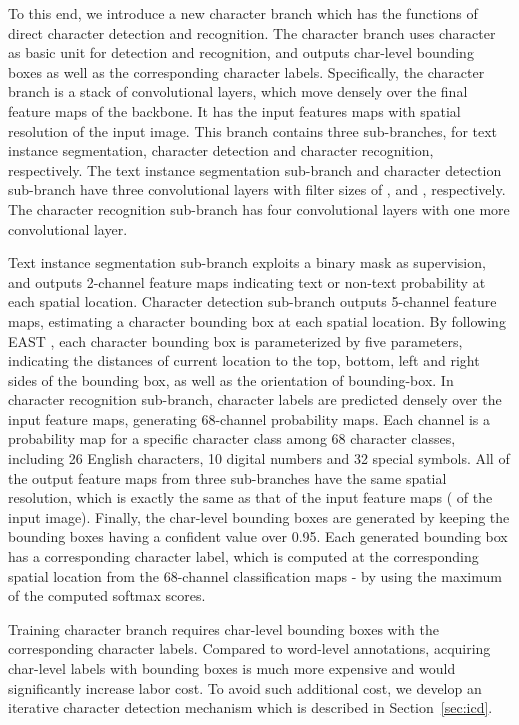 \documentclass[10pt,twocolumn,letterpaper]{article}
\begin{document}
To this end, we introduce a new character branch which has the functions of direct character detection and recognition. The character branch uses character as basic unit for detection and recognition, and outputs char-level bounding boxes as well as the corresponding character labels. Specifically, the character branch is a stack of convolutional layers, which move densely over the final feature maps of the backbone.
It has the input features maps with  spatial resolution of the input image. This branch contains three sub-branches, for text instance segmentation, character detection and character recognition, respectively. The text instance segmentation sub-branch and character detection sub-branch have three convolutional layers with filter sizes of ,  and , respectively. The character recognition sub-branch has four convolutional layers with one more  convolutional layer.


Text instance segmentation sub-branch exploits a binary mask as supervision, and outputs 2-channel feature maps indicating text or non-text probability at each spatial location. Character detection sub-branch outputs 5-channel feature maps, estimating a character bounding box at each spatial location. By following EAST \cite{zhou2017east}, each character bounding box is parameterized by five parameters, indicating the distances of current location to the top, bottom, left and right sides of the bounding box, as well as the orientation of bounding-box. In character recognition sub-branch, character labels are predicted densely over the input feature maps, generating 68-channel probability maps. Each channel is a probability map for a specific character class among 68 character classes, including 26 English characters, 10 digital numbers and 32 special symbols. All of the output feature maps from three sub-branches have the same spatial resolution, which is exactly the same as that of the input feature maps ( of the input image).
Finally, the char-level bounding boxes are generated by keeping the bounding boxes having a confident value over 0.95.  Each generated bounding box has a corresponding character label, which is computed at the corresponding spatial location from the 68-channel classification maps - by using the maximum of the computed softmax scores.





Training character branch requires char-level bounding boxes with the corresponding character labels. Compared to word-level annotations, acquiring char-level labels with bounding boxes is much more expensive and would significantly increase labor cost. To avoid such additional cost, we develop an iterative character detection mechanism which is described in Section~\ref{sec:icd}.
\end{document}
